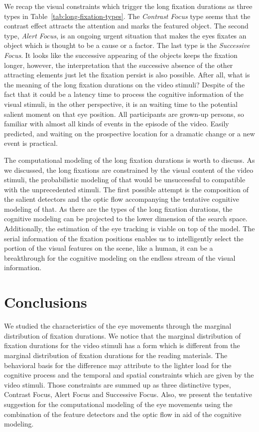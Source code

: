 \documentclass[10pt,letterpaper]{article}
\begin{document}
We recap the visual constraints which trigger the long fixation durations as three types in Table~\ref{tab:long-fixation-types}. The \textit{Contrast Focus} type seems that the contrast effect attracts the attention and marks the featured object. The second type, \textit{Alert Focus}, is an ongoing urgent situation that makes the eyes fixates an object which is thought to be a cause or a factor. The last type is the \textit{Successive Focus}. It looks like the successive appearing of the objects keeps the fixation longer, however, the interpretation that the successive absence of the other attracting elements just let the fixation persist is also possible. After all, what is the meaning of the long fixation durations on the video stimuli? Despite of the fact that it could be a latency time to process the cognitive information of the visual stimuli, in the other perspective, it is an waiting time to the potential salient moment on that eye position. All participants are grown-up persons, so familiar with almost all kinds of events in the episode of the video. Easily predicted, and waiting on the prospective location for a dramatic change or a new event is practical.

The computational modeling of the long fixation durations is worth to discuss. As we discussed, the long fixations are constrained by the visual content of the video stimuli, the probabilistic modeling of that would be unsuccessful to compatible with the unprecedented stimuli. The first possible attempt is the composition of the salient detectors \cite{marr1980,canny1986} and the optic flow \cite{koenderink1986} accompanying the tentative cognitive modeling of that. As there are the types of the long fixation durations, the cognitive modeling can be projected to the lower dimension of the search space. Additionally, the estimation of the eye tracking is viable on top of the model. The serial information of the fixation positions enables us to intelligently select the portion of the visual features on the scene, like a human, it can be a breakthrough for the cognitive modeling on the endless stream of the visual information.


\section{Conclusions}

We studied the characteristics of the eye movements through the marginal distribution of fixation durations. We notice that the marginal distribution of fixation durations for the video stimuli has a form which is different from the marginal distribution of fixation durations for the reading materials. The behavioral basis for the difference may attribute to the lighter load for the cognitive process and the temporal and spatial constraints which are given by the video stimuli. Those constraints are summed up as three distinctive types, Contrast Focus, Alert Focus and Successive Focus. Also, we present the tentative suggestion for the computational modeling of the eye movements using the combination of the feature detectors and the optic flow in aid of the cognitive modeling.
\end{document}
